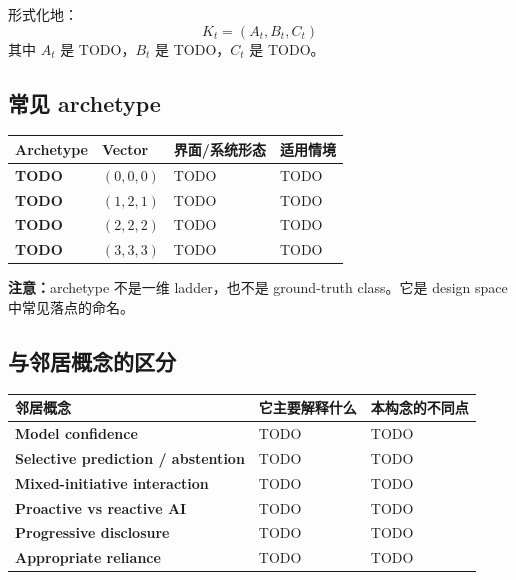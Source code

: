 形式化地：
\[
K_t = (A_t, B_t, C_t)
\]
其中 $A_t$ 是 TODO，$B_t$ 是 TODO，$C_t$ 是 TODO。


\subsection{常见 archetype}

\begin{center}
\small
\begin{tabularx}{\textwidth}{>{\bfseries}p{}p{}p{}X}
\toprule
Archetype & Vector & 界面/系统形态 & 适用情境 \\
\midrule
TODO & $(0, 0, 0)$ & TODO & TODO \\
TODO & $(1, 2, 1)$ & TODO & TODO \\
TODO & $(2, 2, 2)$ & TODO & TODO \\
TODO & $(3, 3, 3)$ & TODO & TODO \\
\bottomrule
\end{tabularx}
\end{center}

\textbf{注意：}archetype 不是一维 ladder，也不是 ground-truth class。它是 design space
中常见落点的命名。


\subsection{与邻居概念的区分}

\begin{center}
\small
\begin{tabularx}{\textwidth}{>{\bfseries}p{}X X}
\toprule
邻居概念 & 它主要解释什么 & 本构念的不同点 \\
\midrule
Model confidence & TODO & TODO \\
Selective prediction / abstention & TODO & TODO \\
Mixed-initiative interaction & TODO & TODO \\
Proactive vs reactive AI & TODO & TODO \\
Progressive disclosure & TODO & TODO \\
Appropriate reliance & TODO & TODO \\
\bottomrule
\end{tabularx}
\end{center}

